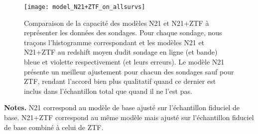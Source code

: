 \documentclass[../main/main.tex]{subfiles}
\begin{document}
\begin{figure}[p]
    \centerfloat
    \texttt{[image: model\_N21+ZTF\_on\_allsurvs]}
    \caption[Comparaison de la capacité des modèles N21 et N21+ZTF à représenter
    les données des sondages]{Comparaison de la capacité des modèles N21 et
    N21+ZTF à représenter les données des sondages. Pour chaque sondage, nous
traçons l'histogramme correspondant et les modèles N21 et N21+ZTF au redshift
moyen dudit sondage en ligne (et bande) bleue et violette respectivement (et
leurs erreurs). Le modèle N21 présente un meilleur ajustement pour chacun des
sondages sauf pour ZTF, rendant l'accord bien plus qualitatif quand ce dernier
est inclus dans l'échantillon total que quand il ne l'est pas.}
    \label{fig:bzcomp}
\end{figure}

\begin{table}[ht]
    \centering
        \caption[Capacité des modèles N21 et N21+ZTF à représenter les
        données]{Valeurs des quantités $-2\ln(L)$ des modèles N21 et N21+ZTF par
        sondage.}
        \label{tab:bzcomp}
    \begin{threeparttable}
        \begin{tablenotes}[flushleft]
        \item\small \textbf{\hspace{-3.2pt}Notes.} N21 correspond au modèle de
            base ajusté sur l'échantillon fiduciel de base. N21+ZTF correspond
            au même modèle mais ajusté sur l'échantillon fiduciel de base
            combiné à celui de ZTF.
        \end{tablenotes}
    \end{threeparttable}
\end{table}
\end{document}
